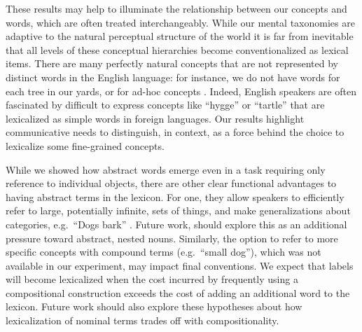 \documentclass[10pt,letterpaper]{article}
\newcommand{\ndg}[1]{\textcolor{Green}{[ndg: #1]}}
\newcommand{\mf}[1]{\textcolor{Red}{[ndg: #1]}}
\begin{document}
These results may help to illuminate the relationship between our concepts and words, which are often treated interchangeably. While our mental taxonomies are adaptive to the natural perceptual structure of the world \cite{MervisRosch81_CategorizationReview} %
it is far from inevitable that all levels of these conceptual hierarchies become conventionalized as lexical items. There are many perfectly natural concepts that are not represented by distinct words in the English language: for instance, we do not have words for each tree in our yards, or for ad-hoc concepts %
\cite{Barsalou83_AdHocCategories}. Indeed, English speakers are often fascinated by difficult to express concepts like ``hygge'' or ``tartle'' that are lexicalized as simple words in foreign languages.
Our results highlight communicative needs to distinguish, in context, as a force behind the choice to lexicalize some fine-grained concepts.

While we showed how abstract words emerge even in a task requiring only reference to individual objects, there are other clear functional advantages to having abstract terms in the lexicon. For one, they allow speakers to efficiently refer to large, potentially infinite, sets of things, and make generalizations about categories, e.g.\ ``Dogs bark'' \cite{TesslerGoodman16_Generics}. Future work, should explore this as an additional pressure toward abstract, nested nouns.
Similarly, the option to refer to more specific concepts with compound terms (e.g.~``small dog''), which was not available in our experiment, may impact final conventions.
We expect that labels will become lexicalized when the cost incurred by frequently using a compositional construction exceeds the cost of adding an additional word to the lexicon. 
Future work should also explore these hypotheses about how lexicalization of nominal terms trades off with compositionality. 



\end{document}
